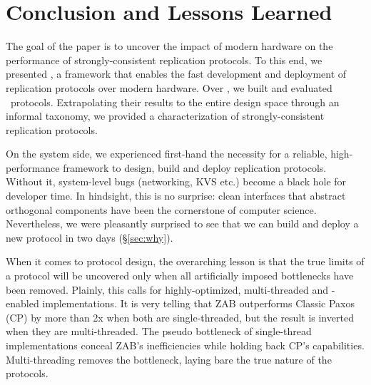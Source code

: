 \section{Conclusion and Lessons Learned}
\label{sec:conclusion}

The goal of the paper is to uncover the impact of modern hardware on the performance of strongly-consistent replication protocols.
To this end, we presented \odlib, a framework that enables the fast development and deployment of replication protocols over modern hardware. 
Over \odlib, we built and evaluated \pnum\ protocols. 
Extrapolating their results to the entire design space through an informal taxonomy, we provided a characterization of strongly-consistent replication protocols.

On the system side, we experienced first-hand the necessity for a reliable, high-performance framework to design, build and deploy replication protocols. Without it, system-level bugs (networking, KVS etc.) become a black hole for developer time.
In hindsight, this is no surprise: clean interfaces that abstract orthogonal components have been the cornerstone of computer science. %
Nevertheless, 
we were pleasantly surprised to see that we can build and deploy a new protocol in two days (\S\ref{sec:why}). 

When it comes to protocol design, the overarching lesson is that the true limits of a protocol will be uncovered only when all artificially imposed bottlenecks have been removed. 
Plainly, this calls for highly-optimized, multi-threaded and \RDMA-enabled implementations. 
It is very telling that ZAB outperforms Classic Paxos (CP) by more than 2x when both are single-threaded, but the result is inverted when they are multi-threaded. 
The pseudo bottleneck of single-thread implementations conceal ZAB's inefficiencies while holding back CP's capabilities. Multi-threading removes the bottleneck, laying bare the true nature of the protocols.




